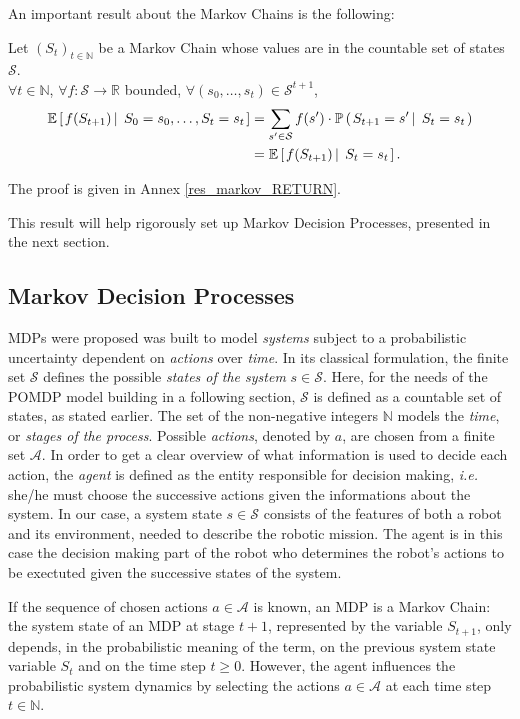 An important result about the Markov Chains is the following:
\begin{Property} \label{res_markov}
Let $(S_t)_{t \in \mathbb{N}}$ be a Markov Chain 
whose values are in the countable set of states $\mathcal{S}$.\\ 
$\forall t \in \mathbb{N}$, $\forall f: \mathcal{S} \rightarrow \mathbb{R}$ bounded, 
$\forall (s_0,\ldots,s_{t}) \in \mathcal{S}^{t+1}$,
\begin{align*}
\mathbb{E} \left[ \left.  f(S_{t+1}) \, \right| \left. \, S_0 = s_0, \ldots, S_t = s_t  \right. \right]  
&= \sum_{s' \in \mathcal{S}} f(s') \cdot \mathbb{P} \left( \left.  S_{t+1} = s' \, \right| \left. \, S_t = s_t  \right. \right) \\
&= \mathbb{E} \left[ \left.  f(S_{t+1}) \, \right| \left. \, S_t = s_t  \right. \right].
\end{align*}
\end{Property}
The proof is given in Annex \ref{res_markov_RETURN}.

This result will help rigorously set up Markov Decision Processes,
presented in the next section.

\subsection{Markov Decision Processes}
\label{subsection_MDP}
MDPs \cite{puterman94} were proposed
was built to model \textit{systems} 
subject to a probabilistic uncertainty
dependent on \textit{actions} over \textit{time}.
In its classical formulation, the finite set $\mathcal{S}$
defines the possible \textit{states of the system} $s \in \mathcal{S}$.
Here, for the needs of 
the POMDP model building 
in a following section,
$\mathcal{S}$ is defined as a countable set of states, 
as stated earlier.
The set of the non-negative integers $\mathbb{N}$ 
models the \textit{time},
or \textit{stages of the process}.
Possible \textit{actions}, denoted by $a$, 
are chosen from a finite set $\mathcal{A}$.
In order to get a clear overview 
of what information is used 
to decide each action, 
the \textit{agent} is defined as
the entity responsible for decision making,
\textit{i.e.} she/he must choose the successive actions
given the informations about the system.
In our case, a system state $s \in \mathcal{S}$ 
consists of the features of both a robot 
and its environment,
needed to describe the robotic mission.
The agent is in this case 
the decision making part of the robot
who determines the robot's actions
to be exectuted 
given the successive states of the system.

If the sequence of chosen actions $a \in \mathcal{A}$
is known, an MDP is a Markov Chain:
the system state of an MDP at stage $t+1$,
represented by the variable $S_{t+1}$,
only depends, in the probabilistic meaning of the term,
on the previous system state variable $S_t$
and on the time step $t\geqslant 0$.
However, the agent influences the probabilistic system dynamics
by selecting the actions $a \in \mathcal{A}$ 
at each time step $t \in \mathbb{N}$.

